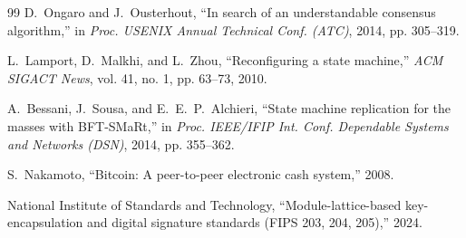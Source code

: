 \documentclass[journal]{IEEEtran}
\begin{document}
\begin{thebibliography}{99}
 D.~Ongaro and J.~Ousterhout, ``In search of an understandable consensus
algorithm,'' in \emph{Proc. USENIX Annual Technical Conf. (ATC)}, 2014, pp. 305--319.

 L.~Lamport, D.~Malkhi, and L.~Zhou, ``Reconfiguring a state machine,''
\emph{ACM SIGACT News}, vol. 41, no. 1, pp. 63--73, 2010.

 A.~Bessani, J.~Sousa, and E.~E.~P.~Alchieri, ``State machine replication for
the masses with BFT-SMaRt,'' in \emph{Proc. IEEE/IFIP Int. Conf. Dependable Systems and Networks
(DSN)}, 2014, pp. 355--362.

 S.~Nakamoto, ``Bitcoin: A peer-to-peer electronic cash system,'' 2008.

 National Institute of Standards and Technology, ``Module-lattice-based
key-encapsulation and digital signature standards (FIPS 203, 204, 205),'' 2024.
\end{thebibliography}
\end{document}
